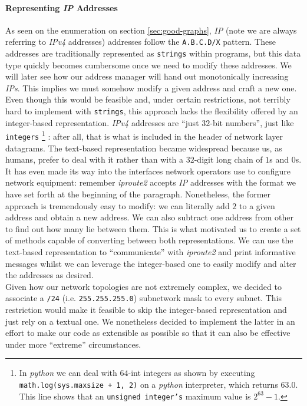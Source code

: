     \paragraph{Representing \textit{IP} Addresses}
        As seen on the enumeration on section \ref{sec:good-graphs}, \textit{IP} (note we are always referring to \textit{IPv4} addresses) addresses follow the \texttt{A.B.C.D/X} pattern. These addresses are traditionally represented as \texttt{strings} within programs, but this data type quickly becomes cumbersome once we need to modify these addresses. We will later see how our address manager will hand out monotonically increasing \textit{IPs}. This implies we must somehow modify a given address and craft a new one. Even though this would be feasible and, under certain restrictions, not terribly hard to implement with \texttt{strings}, this approach lacks the flexibility offered by an integer-based representation. \textit{IPv4} addresses are ``just $32$-bit numbers'', just like \texttt{integers} \footnote{In \textit{python} we can deal with $64$-int integers as shown by executing \texttt{math.log(sys.maxsize + 1, 2)} on a \textit{python} interpreter, which returns $63.0$. This line shows that an \texttt{unsigned integer's} maximum value is $2^{63} - 1$.\footnotemark{}} : after all, that is what is included in the header of network layer datagrams. The text-based representation became widespread because us, as humans, prefer to deal with it rather than with a $32$-digit long chain of $1$s and $0$s. It has even made its way into the interfaces network operators use to configure network equipment: remember \textit{iproute2} accepts \textit{IP} addresses with the format we have set forth at the beginning of the paragraph. Nonetheless, the former approach is tremendously easy to modify: we can literally add $2$ to a given address and obtain a new address. We can also subtract one address from other to find out how many lie between them. This is what motivated us to create a set of methods capable of converting between both representations. We can use the text-based representation to ``communicate'' with \textit{iproute2} and print informative messages whilst we can leverage the integer-based one to easily modify and alter the addresses as desired.\\

    Given how our network topologies are not extremely complex, we decided to associate a \texttt{/24} (i.e. \texttt{255.255.255.0}) subnetwork mask to every subnet. This restriction would make it feasible to skip the integer-based representation and just rely on a textual one. We nonetheless decided to implement the latter in an effort to make our code as extensible as possible so that it can also be effective under more ``extreme'' circumstances.\\


